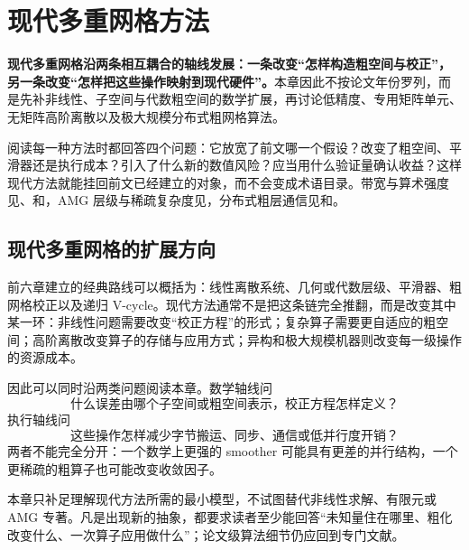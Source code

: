 \chapter{现代多重网格方法}
\label{ch:modern}

\begin{keybox}
\textbf{现代多重网格沿两条相互耦合的轴线发展：一条改变“怎样构造粗空间与校正”，另一条改变“怎样把这些操作映射到现代硬件”。}本章因此不按论文年份罗列，而是先补非线性、子空间与代数粗空间的数学扩展，再讨论低精度、专用矩阵单元、无矩阵高阶离散以及极大规模分布式粗网格算法。

阅读每一种方法时都回答四个问题：它放宽了前文哪一个假设？改变了粗空间、平滑器还是执行成本？引入了什么新的数值风险？应当用什么验证量确认收益？这样现代方法就能挂回前文已经建立的对象，而不会变成术语目录。带宽与算术强度见、和，AMG 层级与稀疏复杂度见，分布式粗层通信见和。
\end{keybox}

\section{现代多重网格的扩展方向}

前六章建立的经典路线可以概括为：线性离散系统、几何或代数层级、平滑器、粗网格校正以及递归 V-cycle。现代方法通常不是把这条链完全推翻，而是改变其中某一环：非线性问题需要改变“校正方程”的形式；复杂算子需要更自适应的粗空间；高阶离散改变算子的存储与应用方式；异构和极大规模机器则改变每一级操作的资源成本。

因此可以同时沿两类问题阅读本章。数学轴线问
\begin{equation}
\boxed{\text{什么误差由哪个子空间或粗空间表示，校正方程怎样定义？}}
\end{equation}
执行轴线问
\begin{equation}
\boxed{\text{这些操作怎样减少字节搬运、同步、通信或低并行度开销？}}
\end{equation}
两者不能完全分开：一个数学上更强的 smoother 可能具有更差的并行结构，一个更稀疏的粗算子也可能改变收敛因子。

\begin{warningbox}
本章只补足理解现代方法所需的最小模型，不试图替代非线性求解、有限元或 AMG 专著。凡是出现新的抽象，都要求读者至少能回答“未知量住在哪里、粗化改变什么、一次算子应用做什么”；论文级算法细节仍应回到专门文献。
\end{warningbox}

